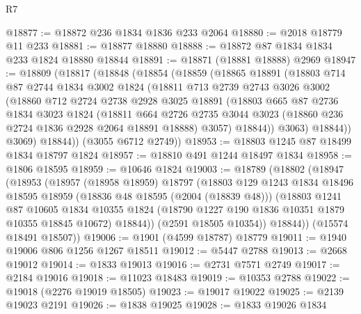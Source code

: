 \begin{lexlean}{R7}
\begin{coremodule}
@18877 := @18872 @236 @1834 @1836 @233 @2064
@18880 := @2018 @18779 @11 @233
@18881 := @18877 @18880
@18888 := @18872 @87 @1834 @1834 @233 @1824 @18880 @18844
@18891 := @18871 (@18881 @18888) @2969
@18947 := @18809
    (@18817
      (@18848
        (@18854
          (@18859
            (@18865
              @18891
              (@18803
                @714
                @87
                @2744
                @1834
                @3002
                @1824
                (@18811
                  @713
                  @2739
                  @2743
                  @3026
                  @3002
                  (@18860
                    @712
                    @2724
                    @2738
                    @2928
                    @3025
                    @18891
                    (@18803
                      @665
                      @87
                      @2736
                      @1834
                      @3023
                      @1824
                      (@18811
                        @664
                        @2726
                        @2735
                        @3044
                        @3023
                        (@18860 @236 @2724 @1836 @2928 @2064 @18891 @18888)
                        @3057)
                      @18844))
                  @3063)
                @18844))
            @3069)
          @18844))
      (@3055 @6712 @2749))
@18953 := @18803 @1245 @87 @18499 @1834 @18797 @1824
@18957 := @18810 @491 @1244 @18497 @1834
@18958 := @1806 @18595
@18959 := @10646 @1824
@19003 := @18789
    (@18802
      (@18947
        (@18953
          (@18957
            (@18958 @18959)
            @18797
            (@18803
              @129
              @1243
              @1834
              @18496
              @18595
              @18959
              (@18836 @48 @18595 (@2004 (@18839 @48)))
              (@18803
                @1241
                @87
                @10605
                @1834
                @10355
                @1824
                (@18790 @1227 @190 @1836 @10351 @1879 @10355 @18845 @10672)
                @18844))
            (@2591 @18505 @10354))
          @18844))
      (@15574 @18491 @18507))
@19006 := @1901 (@4599 @18787) @18779
@19011 := @1940 @19006 @806 @1256 @1267 @18511
@19012 := @5447 @2788
@19013 := @2668 @19012
@19014 := @1833 @19013
@19016 := @2731 @7571 @2749
@19017 := @2184 @19016
@19018 := @11023 @18483
@19019 := @10353 @2788
@19022 := @19018 (@2276 @19019 @18505)
@19023 := @19017 @19022
@19025 := @2139 @19023 @2191
@19026 := @1838 @19025
@19028 := @1833 @19026 @1834

\end{coremodule}
\end{lexlean}
